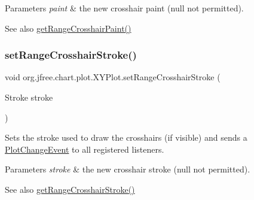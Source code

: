 \begin{DoxyParams}{Parameters}
{\em paint} & the new crosshair paint ({\ttfamily null} not permitted).\\
\hline
\end{DoxyParams}
\begin{DoxySeeAlso}{See also}
\mbox{\hyperlink{classorg_1_1jfree_1_1chart_1_1plot_1_1_x_y_plot_ab531ad9c9bd346bb3c90e9416097e898}{get\+Range\+Crosshair\+Paint()}} 
\end{DoxySeeAlso}
\mbox{\label{classorg_1_1jfree_1_1chart_1_1plot_1_1_x_y_plot_a8e66a4d694e64fad71b706a7ca7e1de2}} 
\subsubsection{\texorpdfstring{set\+Range\+Crosshair\+Stroke()}{setRangeCrosshairStroke()}}
{\footnotesize\ttfamily void org.\+jfree.\+chart.\+plot.\+X\+Y\+Plot.\+set\+Range\+Crosshair\+Stroke (\begin{DoxyParamCaption}\item[{Stroke}]{stroke }\end{DoxyParamCaption})}

Sets the stroke used to draw the crosshairs (if visible) and sends a \mbox{\hyperlink{}{Plot\+Change\+Event}} to all registered listeners.


\begin{DoxyParams}{Parameters}
{\em stroke} & the new crosshair stroke ({\ttfamily null} not permitted).\\
\hline
\end{DoxyParams}
\begin{DoxySeeAlso}{See also}
\mbox{\hyperlink{classorg_1_1jfree_1_1chart_1_1plot_1_1_x_y_plot_a0df9848d6644ca9e10d4b4221c53afa1}{get\+Range\+Crosshair\+Stroke()}} 
\end{DoxySeeAlso}
\mbox{\label{classorg_1_1jfree_1_1chart_1_1plot_1_1_x_y_plot_ac6bdd558bdf17eb82e743b060e8170e8}} 
